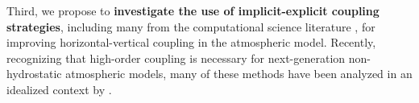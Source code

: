 \documentclass[11pt]{article}
\begin{document}
Third, we propose to \textbf{investigate the use of implicit-explicit coupling strategies}, including many from the computational science literature \citep{UASJRRJS1997AMM, CACMHK2003ANM}, for improving horizontal-vertical coupling in the atmospheric model.  Recently, recognizing that high-order coupling is necessary for next-generation non-hydrostatic atmospheric models, many of these methods have been analyzed in an idealized context by \cite{HWSJLNW2013JCP}.





\end{document}
